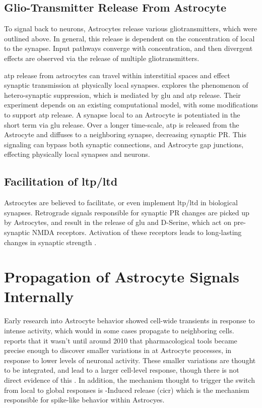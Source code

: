     \subsection{Glio-Transmitter Release From Astrocyte}
    To signal back to neurons, Astrocytes release various gliotransmitters,
    which were outlined above. In general, this release is dependent on the
    concentration of \ca local to the synapse. Input pathways converge with
    \ca concentration, and then divergent effects are observed via the release
    of multiple gliotransmitters.

    \Gls{atp} release from astrocytes can travel within interstitial spaces and
    effect synaptic transmission at physically local
    synapses. \parencite{postnov_2009} explores the phenomenon of
    hetero-synaptic suppression, which is mediated by \Gls{glu} and \Gls{atp}
    release. Their experiment depends on an existing computational model, with
    some modifications to support \Gls{atp} release. A synapse local to an
    Astrocyte is potentiated in the short term via \Gls{glu} release. Over a
    longer time-scale, \Gls{atp} is released from the Astrocyte and diffuses to
    a neighboring synapse, decreasing synaptic PR. This signaling can bypass
    both synaptic connections, and Astrocyte gap junctions, effecting physically
    local synapses and neurons.

    \subsection{Facilitation of \Gls{ltp}/\Gls{ltd}}
    Astrocytes are believed to facilitate, or even implement \Gls{ltp}/\Gls{ltd} in
    biological synapses. Retrograde signals responsible for synaptic PR changes
    are picked up by Astrocytes, and result in the release of \Gls{glu} and D-Serine,
    which act on pre-synaptic NMDA receptors. Activation of these receptors
    leads to long-lasting changes in synaptic strength \parencite{min_2012}.

    \section{Propagation of Astrocyte Signals Internally}
    Early research into Astrocyte behavior showed cell-wide \ca transients in
    response to intense activity, which would in some cases propagate to
    neighboring cells. \parencite{manninen_2018} reports that it wasn't until around
    2010 that pharmacological tools became precise enough to discover smaller
    variations in \ca at Astrocyte processes, in response to lower levels of
    neuronal activity. These smaller variations are thought to be integrated,
    and lead to a larger cell-level \ca response, though there is not direct
    evidence of this \parencite{araque_2014}. In addition, the mechanism thought to
    trigger the switch from local to global responses is \ca-Induced \ca
    release (\Gls{cicr}) which is the mechanism responsible for spike-like behavior
    within Astrocyes.

